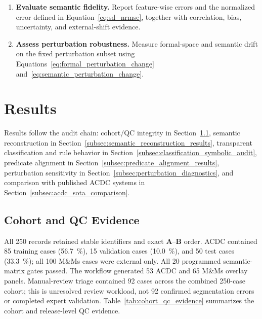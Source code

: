 \documentclass{ceurart}
\newcommand{\matA}{\mathbf{A}}
\newcommand{\matB}{\mathbf{B}}
\begin{document}
\begin{algorithm}[!htbp]
\begin{enumerate}[leftmargin=*,itemsep=2pt,topsep=2pt]
    \item \textbf{Evaluate semantic fidelity.}
    Report feature-wise errors and the normalized error defined in 
    Equation~\eqref{eq:sd_nrmse}, together with correlation, bias, 
    uncertainty, and external-shift evidence.

    \item \textbf{Assess perturbation robustness.}
    Measure formal-space and semantic drift on the fixed perturbation 
    subset using Equations~\eqref{eq:formal_perturbation_change} 
    and~\eqref{eq:semantic_perturbation_change}.

\end{enumerate}
\end{algorithm}

\section{Results}\label{sec:results}

Results follow the audit chain: cohort/QC integrity in Section~\ref{subsec:cohort_qc_evidence}, semantic reconstruction in Section~\ref{subsec:semantic_reconstruction_results}, transparent classification and rule behavior in Section~\ref{subsec:classification_symbolic_audit}, predicate alignment in Section~\ref{subsec:predicate_alignment_results}, perturbation sensitivity in Section~\ref{subsec:perturbation_diagnostics}, and comparison with published ACDC systems in Section~\ref{subsec:acdc_sota_comparison}.

\subsection{Cohort and QC Evidence}\label{subsec:cohort_qc_evidence}

All 250 records retained stable identifiers and exact \(\matA\)--\(\matB\) order. ACDC contained 85 training cases (56.7~\%), 15 validation cases (10.0~\%), and 50 test cases (33.3~\%); all 100 M\&Ms cases were external only. All 20 programmed semantic-matrix gates passed. The workflow generated 53 ACDC and 65 M\&Ms overlay panels. Manual-review triage contained 92 cases across the combined 250-case cohort; this is unresolved review workload, not 92 confirmed segmentation errors or completed expert validation. Table~\ref{tab:cohort_qc_evidence} summarizes the cohort and release-level QC evidence.
\end{document}
